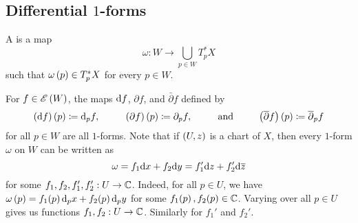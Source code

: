 \documentclass[../Moduli_Spaces_of_Riemann_Surfaces.tex]{subfiles}
\begin{document}
    \subsection{Differential $1$-forms}
    \begin{definition}
        A  is a map
        \begin{equation*}
            \omega:W\to\bigcup_{p\in W}T_p^\ast X
        \end{equation*}
        such that $\omega\left(p\right)\in T_p^\ast X$ for every $p\in W$.
    \end{definition}
    \vspace{-0.05in}
    \begin{example}
        For $f\in\mathscr{E}\left(W\right)$, the maps $\mathrm{d} f$, $\partial f$, and $\bar{\partial}f$ defined by
        \begin{equation*}
            \l(\d f\r)\l(p\r)\coloneqq\d_pf,\ \ \ \ \ \ \ \ \l(\partial f\r)\l(p\r)\coloneqq\partial_pf,\ \ \ \ \ \ \ \ \textrm{and}\ \ \ \ \ \ \ \ \big(\bar{\partial}f\big)\l(p\r)\coloneqq\bar{\partial}_pf
        \end{equation*}
        for all $p\in W$ are all $1$-forms. Note that if $\left(U,z\right)$ is a chart of $X$, then every $1$-form $\omega$ on $W$ can be written as
        \begin{equation*}
            \omega=f_1\mathrm{d} x+f_2\mathrm{d} y=f_1'\mathrm{d} z+f_2'\mathrm{d}\overline{z}
        \end{equation*}
        for some $f_1,f_2,f_1',f_2':U\to\mathbb{C}$. Indeed, for all $p\in U$, we have $\omega\left(p\right)=f_1\!\left(p\right)\mathrm{d}_px+f_2\!\left(p\right)\mathrm{d}_py$ for some $f_1\!\left(p\right),f_2\!\left(p\right)\in\mathbb{C}$. Varying over all $p\in U$ gives us functions $f_1,f_2:U\to\mathbb{C}$. Similarly for $f_1'$ and $f_2'$.\exqed
    \end{example}
\end{document}
